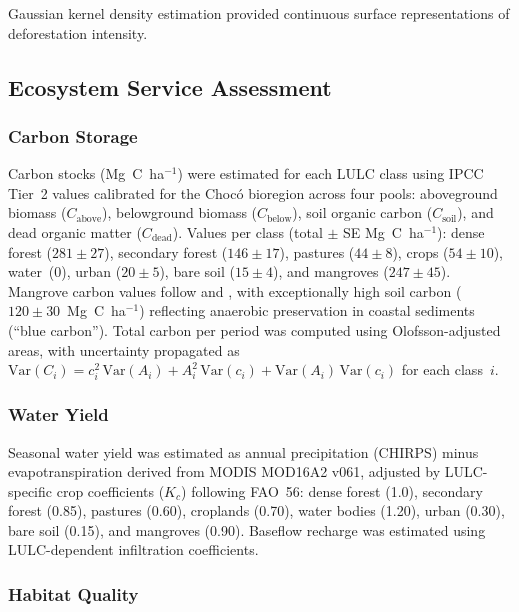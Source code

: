 \documentclass[12pt,a4paper]{article}
\begin{document}
Gaussian kernel density estimation provided continuous surface representations of deforestation intensity.

\subsection{Ecosystem Service Assessment}

\subsubsection{Carbon Storage}

Carbon stocks (Mg~C~ha$^{-1}$) were estimated for each LULC class using IPCC Tier~2 values calibrated for the Choc\'{o} bioregion \citep{Alvarez2012,Phillips2019,IDEAM2018} across four pools: aboveground biomass ($C_\text{above}$), belowground biomass ($C_\text{below}$), soil organic carbon ($C_\text{soil}$), and dead organic matter ($C_\text{dead}$). Values per class (total $\pm$ SE Mg~C~ha$^{-1}$): dense forest ($281 \pm 27$), secondary forest ($146 \pm 17$), pastures ($44 \pm 8$), crops ($54 \pm 10$), water~(0), urban ($20 \pm 5$), bare soil ($15 \pm 4$), and mangroves ($247 \pm 45$). Mangrove carbon values follow \citet{Donato2011} and \citet{Twilley2018}, with exceptionally high soil carbon ($120 \pm 30$~Mg~C~ha$^{-1}$) reflecting anaerobic preservation in coastal sediments (``blue carbon''). Total carbon per period was computed using Olofsson-adjusted areas, with uncertainty propagated as $\text{Var}(C_i) = c_i^2 \, \text{Var}(A_i) + A_i^2 \, \text{Var}(c_i) + \text{Var}(A_i) \, \text{Var}(c_i)$ for each class~$i$.

\subsubsection{Water Yield}

Seasonal water yield was estimated as annual precipitation (CHIRPS) minus evapotranspiration derived from MODIS MOD16A2 v061, adjusted by LULC-specific crop coefficients ($K_c$) following FAO~56: dense forest (1.0), secondary forest (0.85), pastures (0.60), croplands (0.70), water bodies (1.20), urban (0.30), bare soil (0.15), and mangroves (0.90). Baseflow recharge was estimated using LULC-dependent infiltration coefficients.

\subsubsection{Habitat Quality}
\end{document}
